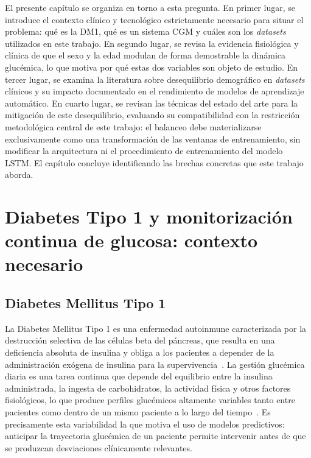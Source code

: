 El presente capítulo se organiza en torno a esta pregunta. En primer lugar, se introduce el contexto clínico y tecnológico estrictamente necesario para situar el problema: qué es la DM1, qué es un sistema CGM y cuáles son los \emph{datasets} utilizados en este trabajo. En segundo lugar, se revisa la evidencia fisiológica y clínica de que el sexo y la edad modulan de forma demostrable la dinámica glucémica, lo que motiva por qué estas dos variables son objeto de estudio. En tercer lugar, se examina la literatura sobre desequilibrio demográfico en \emph{datasets} clínicos y su impacto documentado en el rendimiento de modelos de aprendizaje automático. En cuarto lugar, se revisan las técnicas del estado del arte para la mitigación de este desequilibrio, evaluando su compatibilidad con la restricción metodológica central de este trabajo: el balanceo debe materializarse exclusivamente como una transformación de las ventanas de entrenamiento, sin modificar la arquitectura ni el procedimiento de entrenamiento del modelo LSTM. El capítulo concluye identificando las brechas concretas que este trabajo aborda.

\section{Diabetes Tipo 1 y monitorización continua de glucosa: contexto necesario}
\label{sec:contexto_dm1_cgm}

\subsection{Diabetes Mellitus Tipo 1}

La Diabetes Mellitus Tipo 1 es una enfermedad autoinmune caracterizada por la destrucción selectiva de las células beta del páncreas, que resulta en una deficiencia absoluta de insulina y obliga a los pacientes a depender de la administración exógena de insulina para la supervivencia~\cite{atkinson2014type1}. La gestión glucémica diaria es una tarea continua que depende del equilibrio entre la insulina administrada, la ingesta de carbohidratos, la actividad física y otros factores fisiológicos, lo que produce perfiles glucémicos altamente variables tanto entre pacientes como dentro de un mismo paciente a lo largo del tiempo~\cite{kovatchev2019metrics}. Es precisamente esta variabilidad la que motiva el uso de modelos predictivos: anticipar la trayectoria glucémica de un paciente permite intervenir antes de que se produzcan desviaciones clínicamente relevantes.

